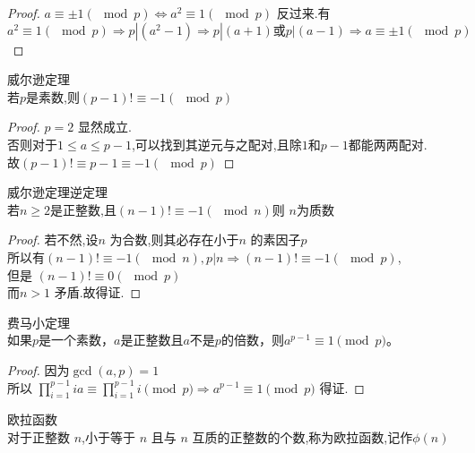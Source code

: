 \begin{proof}
$a \equiv \pm 1(\mod p) \iff a^{2} \equiv 1(\mod p)$
反过来.有\\
$a^{2} \equiv 1(\mod p) \Rightarrow p|(a^2-1) \Rightarrow p|(a+1) 或p|(a-1) \Rightarrow a \equiv \pm 1(\mod p)$
\end{proof}

\begin{theorem}
  威尔逊定理\\
  若$p$是素数,则$(p-1)! \equiv -1 (\mod p)$
\end{theorem}

\begin{proof}
  $p=2$ 显然成立.\\
否则对于$1 \leq a \leq p-1$,可以找到其逆元与之配对,且除$1$和$p-1$都能两两配对.\\
故$(p-1)! \equiv p-1 \equiv -1 (\mod p)$
\end{proof}

\begin{theorem}
  威尔逊定理逆定理\\
  若$n\geq 2$是正整数,且$(n-1)! \equiv -1 (\mod n)$则 $n$为质数
\end{theorem}

\begin{proof}
  若不然,设$n$ 为合数,则其必存在小于$n$ 的素因子$p$\\
所以有$(n-1)! \equiv -1 (\mod n),p|n \Rightarrow (n-1)! \equiv -1 (\mod p)$,\\
但是 $(n-1)! \equiv 0 (\mod p)$\\
而$n>1$ 矛盾.故得证.
\end{proof}

\begin{theorem}
  费马小定理\\
  如果$p$是一个素数，$a$是正整数且$a$不是$p$的倍数，则$a^{p-1} \equiv 1 \pmod{p}$。
\end{theorem}

\begin{proof}
  因为$\gcd(a,p)=1$\\
所以 $\prod_{i=1}^{p-1} ia \equiv \prod_{i=1}^{p-1} i \pmod{p} \Rightarrow a^{p-1} \equiv 1 \pmod{p}$ 得证.
\end{proof}

\begin{definition}
  欧拉函数\\
  对于正整数 $n$,小于等于 $n$ 且与 $n$ 互质的正整数的个数,称为欧拉函数,记作$\phi{(n)}$
\end{definition}

